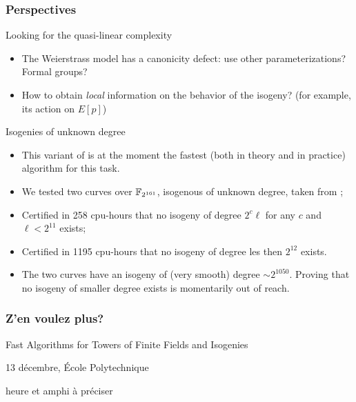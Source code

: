 \documentclass[10pt]{beamer}
\begin{document}
\begin{frame}
  \frametitle{Perspectives}
  
  \begin{block}{Looking for the quasi-linear complexity}
    \begin{itemize}
    \item The Weierstrass model has a canonicity defect: use other parameterizations? Formal groups?
    \item How to obtain \emph{local} information on the behavior of
      the isogeny? (for example, its action on $E[p]$)
    \end{itemize}
  \end{block}

  \begin{block}{Isogenies of unknown degree}
    \begin{itemize}
    \item This variant of \cite{couveignes96} is at the moment the
      fastest (both in theory and in practice) algorithm for this
      task.
    \item We tested two curves over $\mathbb{F}_{2^{161}}$, isogenous of
      unknown degree, taken from \cite{teske06};
    \item Certified in 258 cpu-hours that no isogeny of degree
      $2^c\ell$ for any $c$ and $\ell<2^{11}$ exists;
    \item Certified in 1195 cpu-hours that no isogeny of
      degree les then $2^{12}$ exists.
    \item The two curves have an isogeny of (very smooth) degree $\sim
      2^{1050}$. Proving that no isogeny of smaller degree  exists
      is momentarily out of reach.
    \end{itemize}
  \end{block}
\end{frame}


\begin{frame}
  \frametitle{Z'en voulez plus?}
  
  \begin{center}
    \Large Fast Algorithms for Towers of Finite Fields and Isogenies

    \bigskip

    \large 13 décembre, École Polytechnique

    \normalsize heure et amphi à préciser
  \end{center}
\end{frame}
\end{document}
